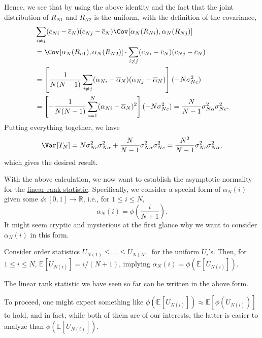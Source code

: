 \begin{explanation}
	Hence, we see that by using the above identity and the fact that the joint distribution of \(R_{N1}\) and \(R_{N2}\) is the uniform, with the definition of the covariance,
	\begin{align*}
		 & \sum_{i \neq j} (c_{Ni} - \overline{c} _N)(c_{Nj} - \overline{c} _N) \Cov_{}[\alpha _N(R_{Ni}) , \alpha _N(R_{Nj})]                                \\
		 & = \Cov_{}[\alpha _N(R_{n1}), \alpha _N(R_{N2})] \cdot \sum_{i \neq j} (c_{Ni} - \overline{c} _N)(c_{Nj} - \overline{c} _N)                         \\
		 & = \left[ \frac{1}{N(N-1)} \sum_{i \neq j} (\alpha _{Ni} - \overline{\alpha} _N) (\alpha _{Nj} - \overline{\alpha} _N) \right] (- N \sigma _{Nc}^2) \\
		 & = \left[ - \frac{1}{N(N-1)} \sum_{i=1}^{N} (\alpha _{Ni} - \overline{\alpha} _N)^2 \right] (- N \sigma _{Nc}^2)
		= \frac{N}{N-1} \sigma _{N \alpha }^2 \sigma _{Nc}^2 .
	\end{align*}
	Putting everything together, we have
	\[
		\Var_{}[T_N]
		= N \sigma _{Nc}^2 \sigma _{N \alpha }^2 + \frac{N}{N-1} \sigma _{N \alpha }^2 \sigma _{Nc}^2
		= \frac{N^2}{N-1}\sigma _{Nc}^2 \sigma _{N \alpha }^2,
	\]
	which gives the desired result.
\end{explanation}

With the above calculation, we now want to establish the asymptotic normality for the \hyperref[def:linrea-rank-statistic]{linear rank statistic}. Specifically, we consider a special form of \(\alpha _N(i)\) given some \(\phi \colon [0, 1] \to \mathbb{R} \), i.e., for \(1 \leq i \leq N\),
\[
	\alpha _N(i) = \phi \left( \frac{i}{N+1} \right) .
\]
It might seem cryptic and mysterious at the first glance why we want to consider \(\alpha _N(i)\) in this form.

\begin{intuition}
	Consider order statistics \(U_{N(1)} \leq \dots \leq U_{N(N)}\) for the uniform \(U_i\)'s. Then, for \(1 \leq i \leq N\), \(\mathbb{E}_{}[U_{N(i)}] = i / (N+1)\), implying \(\alpha _N(i) = \phi (\mathbb{E}_{}[U_{N(i)}] )\).
\end{intuition}

\begin{eg}
	The \hyperref[def:linrea-rank-statistic]{linear rank statistic} we have seen so far can be written in the above form.
\end{eg}

To proceed, one might expect something like \(\phi (\mathbb{E}_{}[U_{N(i)}] ) \approx \mathbb{E}_{}[\phi (U_{N(i)})] \) to hold, and in fact, while both of them are of our interests, the latter is easier to analyze than \(\phi (\mathbb{E}_{}[U_{N(i)}] )\).

